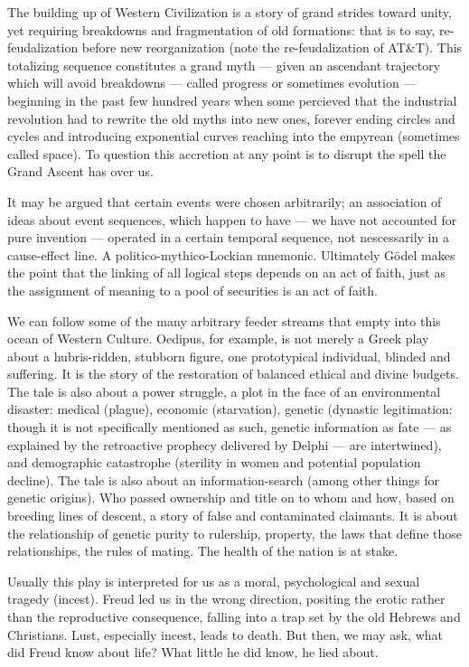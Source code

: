 \documentclass[11pt,twoside,draft]{memoir}
\begin{document}
The building up of Western Civilization is
a story of grand strides toward unity, yet
requiring breakdowns and fragmentation of
old formations: that is to say, re-feudalization before new reorganization (note the
re-feudalization of AT\&T). This totalizing
sequence constitutes a grand myth --- given
an ascendant trajectory which will avoid
breakdowns --- called progress or sometimes
evolution --- beginning in the past few hundred years when some percieved that the
industrial revolution had to rewrite the old
myths into new ones, forever ending circles
and cycles and introducing exponential
curves reaching into the empyrean (sometimes called space). To question this accretion at any point is to disrupt the spell the Grand Ascent has over us.

It may be argued that certain events were
chosen arbitrarily; an association of ideas
about event sequences, which happen to
have --- we have not accounted for pure invention --- operated in a certain temporal sequence, not nescessarily in a cause-effect
line. A politico-mythico-Lockian mnemonic.
Ultimately G\"{o}del makes the point that the
linking of all logical steps depends on an act
of faith, just as the assignment of meaning to
a pool of securities is an act of faith.

We can follow some of the many arbitrary
feeder streams that empty into this ocean of
Western Culture. Oedipus, for example, is
not merely a Greek play about a hubris-ridden, stubborn figure, one prototypical
individual, blinded and suffering. It is the
story of the restoration of balanced ethical
and divine budgets. The tale is also about a
power struggle, a plot in the face of an
environmental disaster: medical (plague),
economic
(starvation), genetic (dynastic legitimation: though it is not specifically mentioned as such, genetic information as fate --- 
as explained by the retroactive prophecy
delivered by Delphi --- are intertwined), and
demographic catastrophe (sterility in women
and potential population decline). The tale
is also about an information-search (among
other things for genetic origins). Who passed
ownership and title on to whom and how,
based on breeding lines of descent, a story of
false and contaminated claimants. It is about
the relationship of genetic purity to rulership, property, the laws that define those
relationships, the rules of mating. The health
of the nation is at stake.

Usually this play is interpreted for us as a
moral, psychological and sexual tragedy (incest). Freud led us in the wrong direction,
positing the erotic rather than the reproductive consequence, falling into a trap set by
the old Hebrews and Christians. Lust, especially incest, leads to death. But then, we
may ask, what did Freud know about life?
What little he did know, he lied about.
\end{document}
